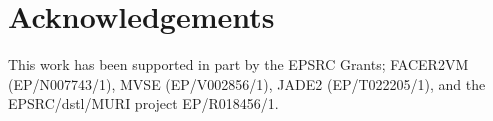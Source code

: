 \documentclass[letterpaper]{article} \usepackage{aaai22}  \usepackage{times}  \usepackage{helvet}  \usepackage{courier}  \usepackage[hyphens]{url}  \usepackage{graphicx} \urlstyle{rm} \def\UrlFont{\rm}  \usepackage{natbib}  \usepackage{caption} \DeclareCaptionStyle{ruled}{labelfont=normalfont,labelsep=colon,strut=off} \frenchspacing  \setlength{\pdfpagewidth}{8.5in}  \setlength{\pdfpageheight}{11in}  \usepackage{algorithm}
\begin{document}
\section{Acknowledgements}
This work has been supported in part by the EPSRC Grants; FACER2VM (EP/N007743/1), MVSE (EP/V002856/1), JADE2 (EP/T022205/1), and the EPSRC/dstl/MURI project EP/R018456/1.



\end{document}
